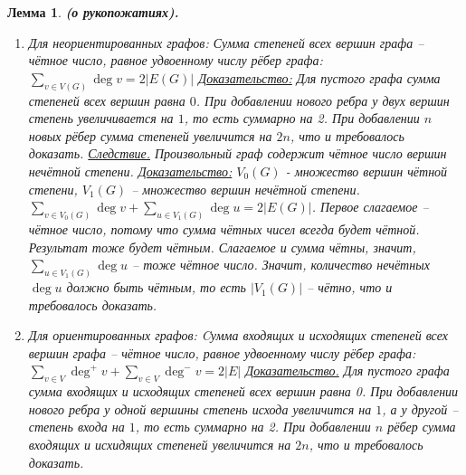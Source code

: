 \documentclass[a4paper,12pt]{article}
\newtheorem*{lemma}{Лемма}
\begin{document}
\begin{lemma}
    \textbf{(о рукопожатиях).} \begin{enumerate}
        \item Для неориентированных графов:\newline 
        Сумма степеней всех вершин графа -- чётное число, равное удвоенному числу рёбер графа: $\sum\limits_{v \in V(G)} \deg v = 2|E(G)|$\newline
        \underline{Доказательство:}\newline
        Для пустого графа сумма степеней всех вершин равна $0$.\newline
        При добавлении нового ребра у двух вершин степень увеличивается на $1$, то есть суммарно на 2.\newline
        При добавлении $n$ новых рёбер сумма степеней увеличится на $2n$, что и требовалось доказать.\newline
        \underline{Следствие.} Произвольный граф содержит чётное число вершин нечётной степени.
        \underline{Доказательство:}\newline
        $V_0(G)$ - множество вершин чётной степени, $V_1(G)$ -- множество вершин нечётной степени.\newline
        $\sum\limits_{v \in V_0(G)} \deg v + \sum\limits_{u \in V_1(G)} \deg u = 2|E(G)|$. Первое слагаемое -- чётное число, потому что сумма чётных чисел всегда будет чётной. Результат тоже будет чётным. Слагаемое и сумма чётны, значит, $\sum\limits_{u \in V_1(G)} \deg u$ -- тоже чётное число. Значит, количество нечётных $\deg u$ должно быть чётным, то есть $|V_1(G)|$ -- чётно, что и требовалось доказать.
        \item Для ориентированных графов:\newline
        Cумма входящих и исходящих степеней всех вершин графа -- чётное число, равное удвоенному числу рёбер графа: $\sum\limits_{v \in V} \deg^+ v + \sum\limits_{v \in V} \deg^- v = 2|E|$\newline
        \underline{Доказательство.}\newline
        Для пустого графа сумма входящих и исходящих степеней всех вершин равна 0.\newline
        При добавлении нового ребра у одной вершины степень исхода увеличится на $1$, а у другой -- степень входа на $1$, то есть суммарно на 2.\newline
        При добавлении $n$ рёбер сумма входящих и исхидящих степеней увеличится на $2n$, что и требовалось доказать.
    \end{enumerate}
\end{lemma}
\end{document}
